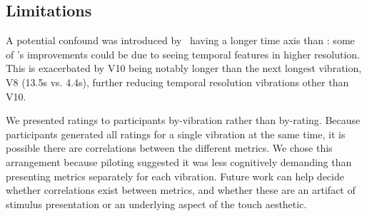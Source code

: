     
    
    
    
    
    \subsection{Limitations}
    A potential confound was introduced by \linear\ having a longer time axis than \original: some of \linear's improvements could be due to seeing temporal features in higher resolution.
    This is exacerbated by V10 being notably longer than the next longest vibration, V8 (13.5s vs. 4.4s), further reducing temporal resolution vibrations other than V10.
    
    We presented ratings to participants by-vibration rather than by-rating.
    Because participants generated all ratings for a single vibration at the same time, it is possible there are correlations between the different metrics.
    We chose this arrangement because piloting suggested it was less cognitively demanding than presenting metrics separately for each vibration.
    Future work can help decide whether correlations exist between metrics, and whether these are an artifact of stimulus presentation or an underlying aspect of the touch aesthetic.
    
